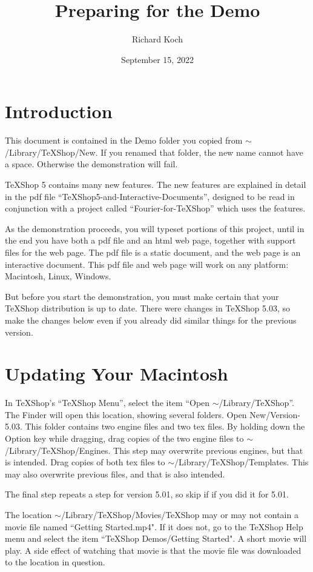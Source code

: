 \documentclass[11pt, oneside]{article}   	%
\title{Preparing for the Demo}
\author{Richard Koch}
\date{September 15, 2022}
\begin{document}
\maketitle

\section{Introduction}

This document is contained in the Demo folder you copied from $\sim$/Library/TeXShop/New. If you renamed that folder, the new name cannot have a space. Otherwise the demonstration will fail.

TeXShop 5 contains many new features. The new features are explained in detail in the pdf file ``TeXShop5-and-Interactive-Documents'', designed to be read in conjunction with a project called ``Fourier-for-TeXShop'' which uses the features.

As the demonstration proceeds, you will typeset portions of this project, until in the end you have both a pdf file and an html web page, together with support files for the web page. The pdf file is a static document, and the web page is an interactive document.  This pdf file and web page will work on any platform: Macintosh, Linux, Windows. 

But before you start the demonstration, you must make certain that your TeXShop distribution is up to date. There were changes in TeXShop 5.03, so make the changes below even if you already did similar things for the previous version.

\section{Updating Your Macintosh}

In TeXShop's ``TeXShop Menu'', select the item ``Open $\sim$/Library/TeXShop''. The Finder will open this location, showing several folders.  Open New/Version-5.03. This folder contains two engine files and two tex files. By holding down the Option key while dragging, drag copies of the two engine files to $\sim$/Library/TeXShop/Engines. This step may overwrite previous engines, but that is intended. Drag copies of both tex files to
$\sim$/Library/TeXShop/Templates. This may also overwrite previous files, and that is also intended.

The final step repeats a step for version 5.01, so skip if if you did it for 5.01.

The location $\sim$/Library/TeXShop/Movies/TeXShop may or may not contain a movie file named ``Getting Started.mp4". If it does not, go to the TeXShop Help menu and select the item ``TeXShop Demos/Getting Started". A short movie will play. A side effect of watching that movie is that the movie file was downloaded to the location in question.
\end{document}

